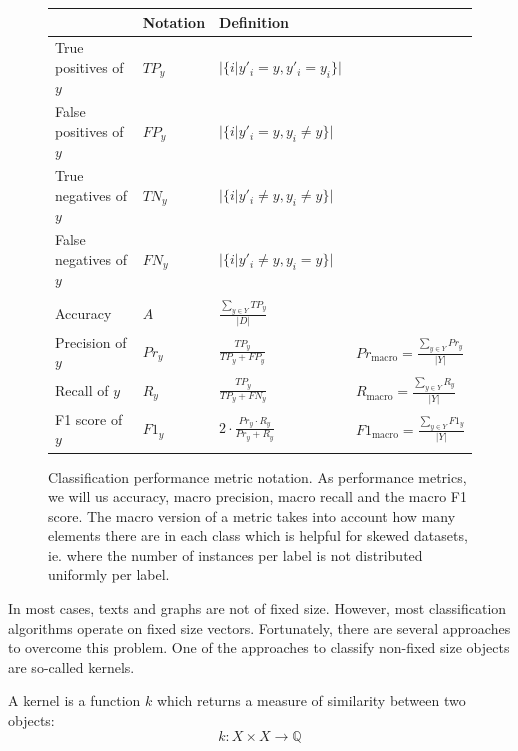 \begin{figure}[htb!]
	\centering
	\renewcommand*{\arraystretch}{1.7}
	\begin{tabular}{llll}
		& Notation & Definition & \\
		\toprule
		True positives of $y$ &
		$TP_y$ &
		$\displaystyle |\{i | y'_i = y, y'_i = y_i \}|$ &
		\\
		False positives of $y$ &
		$FP_y$ &
		$\displaystyle |\{i | y'_i = y, y_i \neq y \}|$ &
		\\
		True negatives of $y$ &
		$TN_y$ &
		$\displaystyle |\{i | y'_i \neq y, y_i \neq y\}|$ &
		\\
		False negatives of $y$ &
		$FN_y$ &
		$\displaystyle |\{i | y'_i \neq y, y_i = y\}|$ &
		\\[1ex]
		\midrule{}%
		\\[-2ex]
		Accuracy &
		$A$ &
		$\displaystyle \frac{\sum\nolimits_{y \in Y} TP_y}{|D|}$ &
		\\[3ex]
		Precision of $y$ &
		$Pr_y$ &
		$\displaystyle \frac{TP_y}{TP_y + FP_y} $ &
		$Pr_{\text{macro}} = \displaystyle \frac{\sum\nolimits_{y \in Y} Pr_y}{|Y|}$
		\\[3ex]
		Recall of $y$ &
		$R_y$ &
		$\displaystyle \frac{TP_y}{TP_y + FN_y}$ &
		$R_{\text{macro}} = \displaystyle \frac{\sum\nolimits_{y \in Y} R_y}{|Y|}$
		\\[3ex]
		F1 score of $y$ &
		$F1_y$ &
		$\displaystyle 2 \cdot \frac{Pr_y \cdot R_y}{Pr_y + R_y}$ &
		$F1_{\text{macro}} = \displaystyle \frac{\sum\nolimits_{y \in Y} F1_y}{|Y|}$
		\\
	\end{tabular}
	\caption[Notation: Classification metrics]{Classification performance metric notation. As performance metrics, we will us accuracy, macro precision, macro recall and the macro F1 score. The macro version of a metric takes into account how many elements there are in each class which is helpful for skewed datasets, ie. where the number of instances per label is not distributed uniformly per label.}\label{fig:classification_metrics}
\end{figure}


In most cases, texts and graphs are not of fixed size.
However, most classification algorithms operate on fixed size vectors.
Fortunately, there are several approaches to overcome this problem.
One of the approaches to classify non-fixed size objects are so-called kernels.

A kernel is a function $k$ which returns a measure of similarity between two objects:
\begin{equation*}
k: X \times X \rightarrow \mathbb{Q}
\end{equation*}

